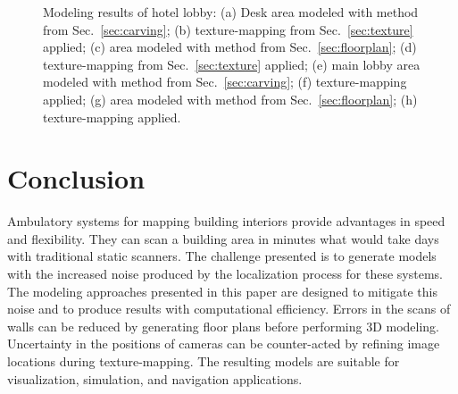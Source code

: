 \documentclass[10pt,twocolumn,twoside]{IEEEtran}
\begin{document}
\begin{figure*}[t]
	\caption{Modeling results of hotel lobby: (a) Desk area modeled with method from Sec.~\ref{sec:carving}; (b) texture-mapping from Sec.~\ref{sec:texture} applied; (c) area modeled with method from Sec.~\ref{sec:floorplan}; (d) texture-mapping from Sec.~\ref{sec:texture} applied; (e) main lobby area modeled with method from Sec.~\ref{sec:carving}; (f) texture-mapping applied; (g) area modeled with method from Sec.~\ref{sec:floorplan}; (h) texture-mapping applied.}
	\label{fig:houston}

\end{figure*}

\section{Conclusion}
\label{sec:conclusion}

Ambulatory systems for mapping building interiors provide advantages in speed and flexibility.  They can scan a building area in minutes what would take days with traditional static scanners.  The challenge presented is to generate models with the increased noise produced by the localization process for these systems.  The modeling approaches presented in this paper are designed to mitigate this noise and to produce results with computational efficiency.  Errors in the scans of walls can be reduced by generating floor plans before performing 3D modeling.  Uncertainty in the positions of cameras can be counter-acted by refining image locations during texture-mapping.  The resulting models are suitable for visualization, simulation, and navigation applications.



%

\vfill

\end{document}
